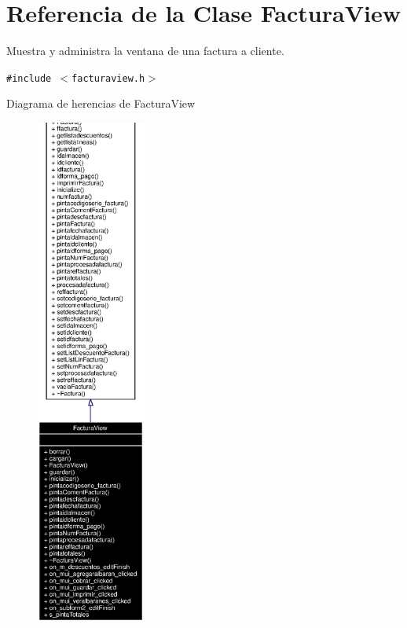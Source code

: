 \section{Referencia de la Clase Factura\-View}
\label{classFacturaView}
Muestra y administra la ventana de una factura a cliente.  


{\tt \#include $<$facturaview.h$>$}

Diagrama de herencias de Factura\-View\begin{figure}[H]
\begin{center}
\leavevmode
\includegraphics[width=101pt]{classFacturaView__inherit__graph}
\end{center}
\end{figure}
